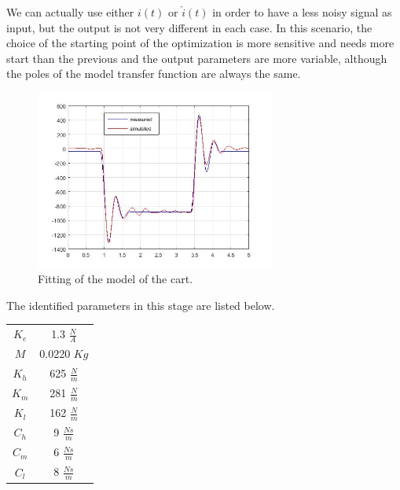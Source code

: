 We can actually use either $i(t)$ or $\hat{i}(t)$ in order to have a less noisy signal as input, but the output is not very different in each case. In this scenario, the choice of the starting point of the optimization is more sensitive and needs more start than the previous and the output parameters are more variable, although the poles of the model transfer function are always the same.
\begin{figure}[h]
\includegraphics[width=0.7\textwidth]{img/graybox_cart.jpg}
\caption{Fitting of the model of the cart.}
\end{figure}

The identified parameters in this stage are listed below.
\begin{table}
\centering
\begin{tabular}{|c|c|}
$K_e$ & 1.3 $\frac{N}{A}$ \\
$M$ & 0.0220 $Kg$ \\
$K_h$ & 625 $\frac{N}{m}$\\
$K_m$ & 281 $\frac{N}{m}$\\
$K_l$ & 162 $\frac{N}{m}$\\
$C_h$ & 9 $\frac{Ns}{m}$\\
$C_m$ & 6 $\frac{Ns}{m}$\\
$C_l$ & 8 $\frac{Ns}{m}$\\
\end{tabular}
\end{table}
